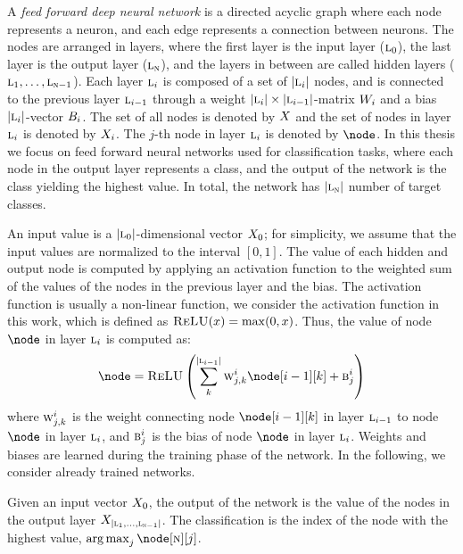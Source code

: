 A \emph{feed forward deep neural network} is a directed acyclic graph where each node represents a neuron, and each edge represents a connection between neurons.
The nodes are arranged in layers, where the first layer is the input layer ($\textsc{l}_0$), the last layer is the output layer ($\textsc{l}_{\textsc{n}}$), and the layers in between are called hidden layers ($\textsc{l}_{1},\ldots,\textsc{l}_{\textsc{n}-1}$).
Each layer $\textsc{l}_{i}$ is composed of a set of $|\textsc{l}_{i}|$ nodes, and is connected to the previous layer $\textsc{l}_{i-1}$ through a weight $|\textsc{l}_{i}|\times|\textsc{l}_{i-1}|$-matrix $W_{i}$ and a bias $|\textsc{l}_{i}|$-vector $B_{i}$.
The set of all nodes is denoted by $X$ and the set of nodes in layer $\textsc{l}_{i}$ is denoted by $X_{i}$. The $j$-th node in layer $\textsc{l}_{i}$ is denoted by $\node$.
In this thesis we focus on feed forward neural networks used for classification tasks, where each node in the output layer represents a class, and the output of the network is the class yielding the highest value. In total, the network has $|\textsc{l}_{\textsc{n}}|$ number of target classes.

An input value is a $|\textsc{l}_0|$-dimensional vector $X_{0}$; for simplicity, we assume that the input values are normalized to the interval $[0,1]$.
The value of each hidden and output node is computed by applying an activation function to the weighted sum of the values of the nodes in the previous layer and the bias. The activation function is usually a non-linear function, we consider the \relu{} activation function in this work, which is defined as $\textsc{ReLU}(x) = \max(0,x)$. Thus, the value of node $\node$ in layer $\textsc{l}_{i}$ is computed as:
\begin{align*}
  \node = \relu\left(
    \sum_{k}^{\cardinalitynospaces{\hiddenlayer{i-1}}}\weight_{j, k}^{i} \node[i-1][k] + \bias_{j}^{i}
  \right)
\end{align*}
where $\textsc{w}_{j, k}^{i}$ is the weight connecting node $\node[i-1][k]$ in layer $\textsc{l}_{i-1}$ to node $\node$ in layer $\textsc{l}_{i}$, and $\textsc{b}_{j}^{i}$ is the bias of node $\node$ in layer $\textsc{l}_{i}$. Weights and biases are learned during the training phase of the network. In the following, we consider already trained networks.

Given an input vector $X_{0}$, the output of the network is the value of the nodes in the output layer $X_{|\textsc{l}_{1},\ldots,\textsc{l}_{\textsc{n}-1}|}$. The classification is the index of the node with the highest value, \ie{} $\argmax_{j} \node[\lastlayerindex][j]$.

